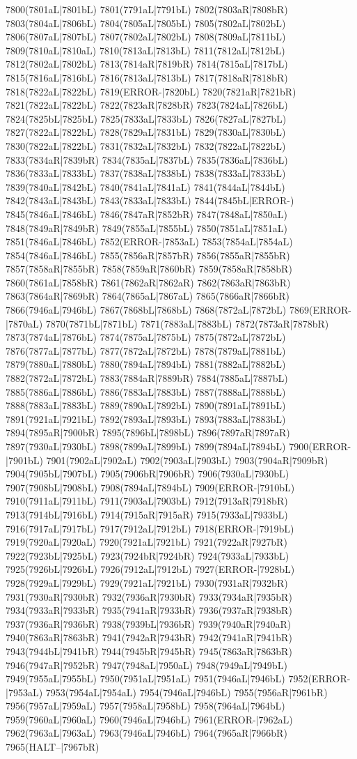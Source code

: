 7800(7801aL|7801bL) 7801(7791aL|7791bL) 7802(7803aR|7808bR) 7803(7804aL|7806bL) 7804(7805aL|7805bL) 7805(7802aL|7802bL) 7806(7807aL|7807bL) 7807(7802aL|7802bL) 7808(7809aL|7811bL) 7809(7810aL|7810aL) 7810(7813aL|7813bL) 7811(7812aL|7812bL) 7812(7802aL|7802bL) 7813(7814aR|7819bR) 7814(7815aL|7817bL) 7815(7816aL|7816bL) 7816(7813aL|7813bL) 7817(7818aR|7818bR) 7818(7822aL|7822bL) 7819(ERROR-|7820bL) 7820(7821aR|7821bR) 7821(7822aL|7822bL) 7822(7823aR|7828bR) 7823(7824aL|7826bL) 7824(7825bL|7825bL) 7825(7833aL|7833bL) 7826(7827aL|7827bL) 7827(7822aL|7822bL) 7828(7829aL|7831bL) 7829(7830aL|7830bL) 7830(7822aL|7822bL) 7831(7832aL|7832bL) 7832(7822aL|7822bL) 7833(7834aR|7839bR) 7834(7835aL|7837bL) 7835(7836aL|7836bL) 7836(7833aL|7833bL) 7837(7838aL|7838bL) 7838(7833aL|7833bL) 7839(7840aL|7842bL) 7840(7841aL|7841aL) 7841(7844aL|7844bL) 7842(7843aL|7843bL) 7843(7833aL|7833bL) 7844(7845bL|ERROR-) 7845(7846aL|7846bL) 7846(7847aR|7852bR) 7847(7848aL|7850aL) 7848(7849aR|7849bR) 7849(7855aL|7855bL) 7850(7851aL|7851aL) 7851(7846aL|7846bL) 7852(ERROR-|7853aL) 7853(7854aL|7854aL) 7854(7846aL|7846bL) 7855(7856aR|7857bR) 7856(7855aR|7855bR) 7857(7858aR|7855bR) 7858(7859aR|7860bR) 7859(7858aR|7858bR) 7860(7861aL|7858bR) 7861(7862aR|7862aR) 7862(7863aR|7863bR) 7863(7864aR|7869bR) 7864(7865aL|7867aL) 7865(7866aR|7866bR) 7866(7946aL|7946bL) 7867(7868bL|7868bL) 7868(7872aL|7872bL) 7869(ERROR-|7870aL) 7870(7871bL|7871bL) 7871(7883aL|7883bL) 7872(7873aR|7878bR) 7873(7874aL|7876bL) 7874(7875aL|7875bL) 7875(7872aL|7872bL) 7876(7877aL|7877bL) 7877(7872aL|7872bL) 7878(7879aL|7881bL) 7879(7880aL|7880bL) 7880(7894aL|7894bL) 7881(7882aL|7882bL) 7882(7872aL|7872bL) 7883(7884aR|7889bR) 7884(7885aL|7887bL) 7885(7886aL|7886bL) 7886(7883aL|7883bL) 7887(7888aL|7888bL) 7888(7883aL|7883bL) 7889(7890aL|7892bL) 7890(7891aL|7891bL) 7891(7921aL|7921bL) 7892(7893aL|7893bL) 7893(7883aL|7883bL) 7894(7895aR|7900bR) 7895(7896bL|7898bL) 7896(7897aR|7897aR) 7897(7930aL|7930bL) 7898(7899aL|7899bL) 7899(7894aL|7894bL) 7900(ERROR-|7901bL) 7901(7902aL|7902aL) 7902(7903aL|7903bL) 7903(7904aR|7909bR) 7904(7905bL|7907bL) 7905(7906bR|7906bR) 7906(7930aL|7930bL) 7907(7908bL|7908bL) 7908(7894aL|7894bL) 7909(ERROR-|7910bL) 7910(7911aL|7911bL) 7911(7903aL|7903bL) 7912(7913aR|7918bR) 7913(7914bL|7916bL) 7914(7915aR|7915aR) 7915(7933aL|7933bL) 7916(7917aL|7917bL) 7917(7912aL|7912bL) 7918(ERROR-|7919bL) 7919(7920aL|7920aL) 7920(7921aL|7921bL) 7921(7922aR|7927bR) 7922(7923bL|7925bL) 7923(7924bR|7924bR) 7924(7933aL|7933bL) 7925(7926bL|7926bL) 7926(7912aL|7912bL) 7927(ERROR-|7928bL) 7928(7929aL|7929bL) 7929(7921aL|7921bL) 7930(7931aR|7932bR) 7931(7930aR|7930bR) 7932(7936aR|7930bR) 7933(7934aR|7935bR) 7934(7933aR|7933bR) 7935(7941aR|7933bR) 7936(7937aR|7938bR) 7937(7936aR|7936bR) 7938(7939bL|7936bR) 7939(7940aR|7940aR) 7940(7863aR|7863bR) 7941(7942aR|7943bR) 7942(7941aR|7941bR) 7943(7944bL|7941bR) 7944(7945bR|7945bR) 7945(7863aR|7863bR) 7946(7947aR|7952bR) 7947(7948aL|7950aL) 7948(7949aL|7949bL) 7949(7955aL|7955bL) 7950(7951aL|7951aL) 7951(7946aL|7946bL) 7952(ERROR-|7953aL) 7953(7954aL|7954aL) 7954(7946aL|7946bL) 7955(7956aR|7961bR) 7956(7957aL|7959aL) 7957(7958aL|7958bL) 7958(7964aL|7964bL) 7959(7960aL|7960aL) 7960(7946aL|7946bL) 7961(ERROR-|7962aL) 7962(7963aL|7963aL) 7963(7946aL|7946bL) 7964(7965aR|7966bR) 7965(HALT--|7967bR) 